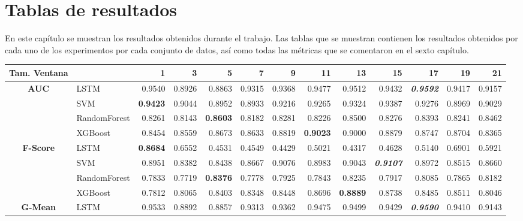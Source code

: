 \appendix
\chapter{Tablas de resultados}
En este capítulo se muestran los resultados obtenidos durante el trabajo. Las tablas que se muestran contienen los resultados obtenidos por cada uno de los experimentos por cada conjunto de datos, así como todas las métricas que se comentaron en el sexto capítulo.\newline

\vspace{1.0in}

\begin{table}[H]
	\begin{adjustbox}{max width=12cm}
		\centering
		\begin{tabular}{|c|l|r|r|r|r|r|r|r|r|r|r|r|}
			\hline
			\textbf{Tam. Ventana}
			&         &      1  &      3  &      5  &      7  &      9  &      11 &      13 &      15 &      17 &      19 &      21 \\
			\hline
			\textbf{AUC} & LSTM &  0.9540 &  0.8926 &  0.8863 &  0.9315 &  0.9368 &  0.9477 &  0.9512 &  0.9432 &  \textit{\textbf{0.9592}} &  0.9417 &  0.9157 \\
			& SVM &  \textbf{0.9423} &  0.9044 &  0.8952 &  0.8933 &  0.9216 &  0.9265 &  0.9324 &  0.9387 &  0.9276 &  0.8969 &  0.9029 \\
			& RandomForest &  0.8261 &  0.8143 &  \textbf{0.8603} &  0.8182 &  0.8281 &  0.8226 &  0.8500 &  0.8276 &  0.8393 &  0.8241 &  0.8462 \\
			& XGBoost &  0.8454 &  0.8559 &  0.8673 &  0.8633 &  0.8819 & \textbf{0.9023} &  0.9000 &  0.8879 &  0.8747 &  0.8704 &  0.8365 \\
			\hline
			\textbf{F-Score} & LSTM &  \textbf{0.8684} &  0.6552 &  0.4531 &  0.4549 &  0.4429 &  0.5021 &  0.4317 &  0.4628 &  0.5140 &  0.6901 &  0.5921 \\
			& SVM &  0.8951 &  0.8382 &  0.8438 &  0.8667 &  0.9076 &  0.8983 &  0.9043 &  \textit{\textbf{0.9107}} &  0.8972 &  0.8515 &  0.8660 \\
			& RandomForest &  0.7833 &  0.7719 &  \textbf{0.8376} &  0.7778 &  0.7925 &  0.7843 &  0.8235 &  0.7917 &  0.8085 &  0.7865 &  0.8182 \\
			& XGBoost &  0.7812 &  0.8065 &  0.8403 &  0.8348 &  0.8448 &  0.8696 &  \textbf{0.8889} &  0.8738 &  0.8485 &  0.8511 &  0.8046 \\
			\hline
			\textbf{G-Mean} & LSTM &  0.9533 &  0.8892 &  0.8857 &  0.9313 &  0.9362 &  0.9475 &  0.9499 &  0.9429 &  \textit{\textbf{0.9590}} &  0.9410 &  0.9143 \\

\end{tabular}
\end{adjustbox}
\end{table}
